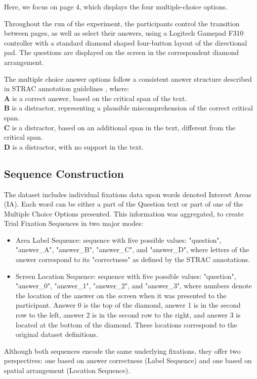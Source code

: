 \documentclass[manuscript,review,anonymous]{acmart}
\begin{document}
    Here, we focus on page 4, which displays the four multiple-choice options.
    
    Throughout the run of the experiment, the participants control the transition between pages, as well as select their answers, using a Logitech Gamepad F310 controller with a standard diamond shaped four-button layout of the directional pad. The questions are displayed on the screen in the correspondent diamond arrangement.  

    The multiple choice answer options follow a consistent answer structure described in STRAC annotation guidelines \citet{berzak2020starc}, where:\\
    \textbf{A} is a correct answer, based on the critical span of the text.\\
    \textbf{B} is a distractor, representing a plausible miscomprehension of the correct critical span. \\
    \textbf{C} is a distractor, based on an additional span in the text, different from the critical span. \\
    \textbf{D} is a distractor, with no support in the text.
    
    
    \subsection{Sequence Construction}
    The dataset includes individual fixations data upon words denoted Interest Areas (IA). Each word can be either a part of the Question text or part of one of the Multiple Choice Options presented. This information was aggregated, to create Trial Fixation Sequences in two major modes:
    \begin{itemize}
        \item Area Label Sequence: sequence with five possible values: "question", "answer\_A", "answer\_B", "answer\_C", and "answer\_D", where letters of the answer correspond to its "correctness" as defined by the STRAC annotations. 
        \item Screen Location Sequence: sequence with five possible values: "question", "answer\_0", "answer\_1", "answer\_2", and "answer\_3", where numbers denote the location of the answer on the screen when it was presented to the participant. Answer 0 is the top of the diamond, answer 1 is in the second row to the left, answer 2 is in the second row to the right, and answer 3 is located at the bottom of the diamond. These locations correspond to the original dataset definitions. 
    
    \end{itemize}
    Although both sequences encode the same underlying fixations, they offer two perspectives: one based on answer correctness (Label Sequence) and one based on spatial arrangement (Location Sequence). 
    
\end{document}
